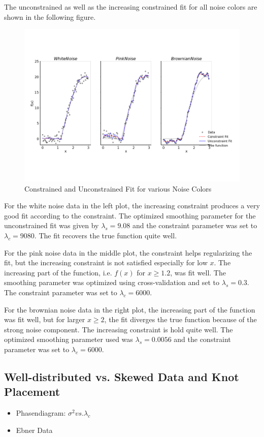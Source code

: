 \documentclass[10pt,a4paper]{article}
\begin{document}
The unconstrained as well as the increasing constrained fit for all noise colors are shown in the following figure.

\begin{figure}[H]
	\centering
	\includegraphics[width=\columnwidth]{../thesisplots/exp_noise_colors.pdf}
	\caption{Constrained and Unconstrained Fit for various Noise Colors}
	\label{fig:fit_noise_colors}
\end{figure}

For the white noise data in the left plot, the increasing constraint produces a very good fit according to the constraint. The optimized smoothing parameter for the unconstrained fit was given by $\lambda_s = 9.08$ and the constraint parameter was set to $\lambda_c = 9080$. The fit recovers the true function quite well. 

For the pink noise data in the middle plot, the constraint helps regularizing the fit, but the increasing constraint is not satisfied especially for low $x$. The increasing part of the function, i.e. $f(x)$ for $x \ge 1.2$,  was fit well. The smoothing parameter was optimized using cross-validation and set to $\lambda_s = 0.3$. The constraint parameter was set to $\lambda_c = 6000$. 

For the brownian noise data in the right plot, the increasing part of the function was fit well, but for larger $x \ge 2$, the fit diverges the true function because of the strong noise component. The increasing constraint is hold quite well. The optimized smoothing parameter used was $\lambda_s = 0.0056$ and the constraint parameter was set to $\lambda_c = 6000$.

\subsection{Well-distributed vs. Skewed Data and Knot Placement}


\begin{itemize}
	\item Phasendiagram: $\sigma^2 vs. \lambda_c$
	\item Ebner Data
\end{itemize}
\end{document}
